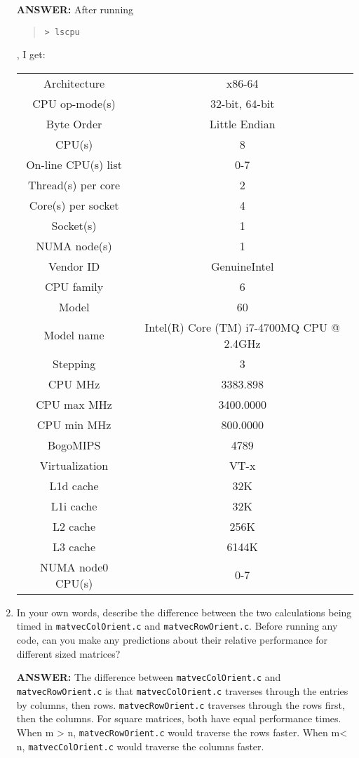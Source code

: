 \documentclass[letter]{article}
\newcommand{\cmd}[1]{\begin{quote}\texttt{> #1}\end{quote}}
\begin{document}
\begin{enumerate}
        \textbf{ANSWER:} After running \cmd{lscpu}, I get: \newline
        \begin{tabular}{c|c}
            Architecture & x86-64 \\
            CPU op-mode(s) & 32-bit, 64-bit \\
            Byte Order & Little Endian \\
            CPU(s) & 8 \\
            On-line CPU(s) list & 0-7 \\
            Thread(s) per core & 2 \\
            Core(s) per socket & 4 \\
            Socket(s) & 1 \\
            NUMA node(s) & 1 \\
            Vendor ID & GenuineIntel \\
            CPU family & 6 \\
            Model & 60 \\
            Model name & Intel(R) Core (TM) i7-4700MQ CPU @ 2.4GHz \\
            Stepping & 3 \\
            CPU MHz & 3383.898 \\
            CPU max MHz & 3400.0000 \\
            CPU min MHz & 800.0000 \\
            BogoMIPS & 4789 \\
            Virtualization & VT-x \\
            L1d cache & 32K \\
            L1i cache & 32K \\
            L2 cache & 256K \\
            L3 cache & 6144K \\
            NUMA node0 CPU(s) & 0-7
        \end{tabular}
        
        \item In your own words, describe the difference between the two calculations being timed in \texttt{matvecColOrient.c} and \texttt{matvecRowOrient.c}. Before running any code, can you make any predictions about their relative performance for different sized matrices? 
        
        \textbf{ANSWER:} The difference between \texttt{matvecColOrient.c} and \texttt{matvecRowOrient.c} is that \texttt{matvecColOrient.c} traverses through the entries by columns, then rows. \texttt{matvecRowOrient.c} traverses through the rows first, then the columns. \newline
        For square matrices, both have equal performance times. When m > n, \texttt{matvecRowOrient.c} would traverse the rows faster. When m< n, \texttt{matvecColOrient.c} would traverse the columns faster.
        

\end{enumerate}
\end{document}
